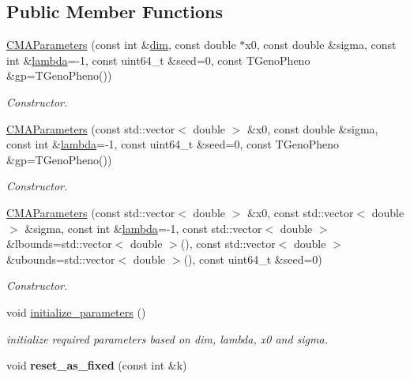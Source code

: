 \subsection*{Public Member Functions}
\begin{DoxyCompactItemize}
\item 
\hyperlink{classlibcmaes_1_1CMAParameters_ae88f7e8821c0e9718828c1836a9534aa}{C\+M\+A\+Parameters} (const int \&\hyperlink{classlibcmaes_1_1Parameters_a95a3c04400a77d134bb1e9705189a24e}{dim}, const double $\ast$x0, const double \&sigma, const int \&\hyperlink{classlibcmaes_1_1Parameters_a3d569987e9a5eb61bc781ee75b2ab18a}{lambda}=-\/1, const uint64\+\_\+t \&seed=0, const T\+Geno\+Pheno \&gp=T\+Geno\+Pheno())
\begin{DoxyCompactList}\small\item\em Constructor. \end{DoxyCompactList}\item 
\hyperlink{classlibcmaes_1_1CMAParameters_aa51327add6c990c80ed773f3536ef618}{C\+M\+A\+Parameters} (const std\+::vector$<$ double $>$ \&x0, const double \&sigma, const int \&\hyperlink{classlibcmaes_1_1Parameters_a3d569987e9a5eb61bc781ee75b2ab18a}{lambda}=-\/1, const uint64\+\_\+t \&seed=0, const T\+Geno\+Pheno \&gp=T\+Geno\+Pheno())
\begin{DoxyCompactList}\small\item\em Constructor. \end{DoxyCompactList}\item 
\hyperlink{classlibcmaes_1_1CMAParameters_aef4446010825fd81710a820743b31bd5}{C\+M\+A\+Parameters} (const std\+::vector$<$ double $>$ \&x0, const std\+::vector$<$ double $>$ \&sigma, const int \&\hyperlink{classlibcmaes_1_1Parameters_a3d569987e9a5eb61bc781ee75b2ab18a}{lambda}=-\/1, const std\+::vector$<$ double $>$ \&lbounds=std\+::vector$<$ double $>$(), const std\+::vector$<$ double $>$ \&ubounds=std\+::vector$<$ double $>$(), const uint64\+\_\+t \&seed=0)
\begin{DoxyCompactList}\small\item\em Constructor. \end{DoxyCompactList}\item 
\hypertarget{classlibcmaes_1_1CMAParameters_a0d963d4719d9b6447cddeeca542167a1}{void \hyperlink{classlibcmaes_1_1CMAParameters_a0d963d4719d9b6447cddeeca542167a1}{initialize\+\_\+parameters} ()}\label{classlibcmaes_1_1CMAParameters_a0d963d4719d9b6447cddeeca542167a1}

\begin{DoxyCompactList}\small\item\em initialize required parameters based on dim, lambda, x0 and sigma. \end{DoxyCompactList}\item 
\hypertarget{classlibcmaes_1_1CMAParameters_aaa8bf42c3ba2a0f2aa0c2878fa0c1d82}{void {\bfseries reset\+\_\+as\+\_\+fixed} (const int \&k)}\label{classlibcmaes_1_1CMAParameters_aaa8bf42c3ba2a0f2aa0c2878fa0c1d82}


\end{DoxyCompactItemize}
